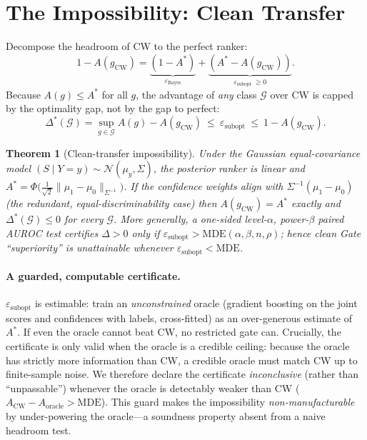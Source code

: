 \documentclass[11pt]{article}
\newtheorem{theorem}{Theorem}
\begin{document}
\section{The Impossibility: Clean Transfer}\label{sec:t9}
Decompose the headroom of CW to the perfect ranker:
\begin{equation}
1-A(g_{\mathrm{CW}})=\underbrace{(1-A^{*})}_{\varepsilon_{\mathrm{Bayes}}}
+\underbrace{(A^{*}-A(g_{\mathrm{CW}}))}_{\varepsilon_{\mathrm{subopt}}\ \ge 0}.
\end{equation}
Because $A(g)\le A^{*}$ for all $g$, the advantage of \emph{any} class
$\mathcal{G}$ over CW is capped by the optimality gap, not by the gap to perfect:
\begin{equation}
\Delta^{*}(\mathcal{G})=\sup_{g\in\mathcal{G}}A(g)-A(g_{\mathrm{CW}})
\ \le\ \varepsilon_{\mathrm{subopt}}\ \le\ 1-A(g_{\mathrm{CW}}).
\label{eq:ceiling}
\end{equation}

\begin{theorem}[Clean-transfer impossibility]\label{thm:t9}
Under the Gaussian equal-covariance model $(S\mid Y{=}y)\sim\mathcal{N}(\mu_y,
\Sigma)$, the posterior ranker is linear and
$A^{*}=\Phi\!\big(\tfrac{1}{\sqrt 2}\lVert\mu_1-\mu_0\rVert_{\Sigma^{-1}}\big)$.
If the confidence weights align with $\Sigma^{-1}(\mu_1-\mu_0)$ (the redundant,
equal-discriminability case) then $A(g_{\mathrm{CW}})=A^{*}$ exactly and
$\Delta^{*}(\mathcal{G})\le 0$ for every $\mathcal{G}$. More generally, a one-sided
level-$\alpha$, power-$\beta$ paired AUROC test certifies $\Delta>0$ only if
$\varepsilon_{\mathrm{subopt}}>\mathrm{MDE}(\alpha,\beta,n,\rho)$; hence clean Gate
``superiority'' is \emph{unattainable} whenever
$\varepsilon_{\mathrm{subopt}}<\mathrm{MDE}$.
\end{theorem}

\paragraph{A guarded, computable certificate.} $\varepsilon_{\mathrm{subopt}}$ is
estimable: train an \emph{unconstrained} oracle (gradient boosting on the joint
scores and confidences with labels, cross-fitted) as an over-generous estimate of
$A^{*}$. If even the oracle cannot beat CW, no restricted gate can. Crucially, the
certificate is only valid when the oracle is a credible ceiling: because the oracle
has strictly more information than CW, a credible oracle must match CW up to
finite-sample noise. We therefore declare the certificate \emph{inconclusive}
(rather than ``unpassable'') whenever the oracle is detectably weaker than CW
($A_{\mathrm{CW}}-A_{\mathrm{oracle}}>\mathrm{MDE}$). This guard makes the
impossibility \emph{non-manufacturable} by under-powering the oracle---a soundness
property absent from a naive headroom test.
\end{document}
